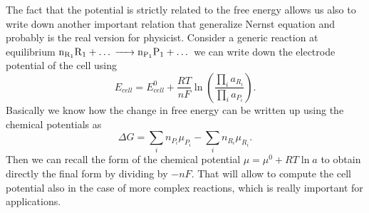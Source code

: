 The fact that the potential is strictly related to the free energy allows us also to write down another important relation that generalize Nernst equation and probably is the real version for physicist.
{
    Consider a generic reaction at equilibrium $\ce{n_{R_1}R_1} + \dots \ce{->} \ce{n_{P_1}P_1} + \dots$ we can write down the electrode potential of the cell using
    \begin{equation}
        E_{cell} = E^0_{cell} + \frac{RT}{nF}\ln\left( \frac{\prod_i a_{R_i}}{\prod_i a_{P_i}} \right).
    \end{equation}
}
{
    Basically we know how the change in free energy can be written up using the chemical potentials as
    \begin{equation}
        \Delta G = \sum_i n_{P_i}\mu_{P_i} - \sum_i n_{R_i}\mu_{R_i}.
    \end{equation}
    Then we can recall the form of the chemical potential $\mu = \mu^0 + RT\ln a$ to obtain directly the final form by dividing by $-nF$.
}
\noindent
That will allow to compute the cell potential also in the case of more complex reactions, which is really important for applications.